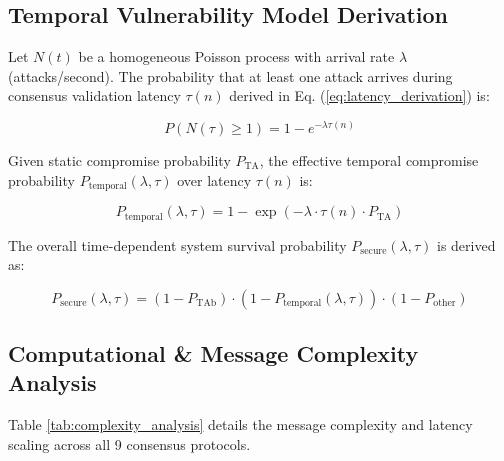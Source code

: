 \documentclass[10pt,twocolumn,journal]{IEEEtran}
\begin{document}
\subsection{Temporal Vulnerability Model Derivation}
Let $N(t)$ be a homogeneous Poisson process with arrival rate $\lambda$ (attacks/second). The probability that at least one attack arrives during consensus validation latency $\tau(n)$ derived in Eq. (\ref{eq:latency_derivation}) is:

\begin{equation}
P(N(\tau) \ge 1) = 1 - e^{-\lambda \tau(n)}
\end{equation}

Given static compromise probability $P_{\text{TA}}$, the effective temporal compromise probability $P_{\text{temporal}}(\lambda, \tau)$ over latency $\tau(n)$ is:

\begin{equation}
P_{\text{temporal}}(\lambda, \tau) = 1 - \exp\left(-\lambda \cdot \tau(n) \cdot P_{\text{TA}}\right)
\end{equation}

The overall time-dependent system survival probability $P_{\text{secure}}(\lambda, \tau)$ is derived as:

\begin{equation}
P_{\text{secure}}(\lambda, \tau) = (1 - P_{\text{TAb}}) \cdot \left(1 - P_{\text{temporal}}(\lambda, \tau)\right) \cdot (1 - P_{\text{other}})
\label{eq:p_secure_2}
\end{equation}

\subsection{Computational & Message Complexity Analysis}
Table \ref{tab:complexity_analysis} details the message complexity and latency scaling across all 9 consensus protocols.
\end{document}
